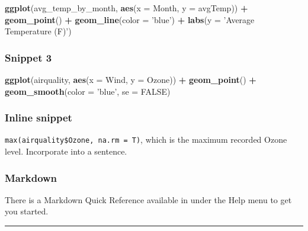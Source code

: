 \documentclass[
]{article}
\newenvironment{Shaded}{\begin{snugshade}}{\end{snugshade}}
\newcommand{\DataTypeTok}[1]{\textcolor[rgb]{0.13,0.29,0.53}{#1}}
\newcommand{\KeywordTok}[1]{\textcolor[rgb]{0.13,0.29,0.53}{\textbf{#1}}}
\newcommand{\NormalTok}[1]{#1}
\newcommand{\OperatorTok}[1]{\textcolor[rgb]{0.81,0.36,0.00}{\textbf{#1}}}
\newcommand{\OtherTok}[1]{\textcolor[rgb]{0.56,0.35,0.01}{#1}}
\newcommand{\StringTok}[1]{\textcolor[rgb]{0.31,0.60,0.02}{#1}}
\begin{document}
\begin{Shaded}
\begin{Highlighting}[]
\KeywordTok{ggplot}\NormalTok{(avg_temp_by_month, }\KeywordTok{aes}\NormalTok{(}\DataTypeTok{x =}\NormalTok{ Month, }\DataTypeTok{y =}\NormalTok{ avgTemp)) }\OperatorTok{+}
\StringTok{  }\KeywordTok{geom_point}\NormalTok{() }\OperatorTok{+}\StringTok{ }
\StringTok{  }\KeywordTok{geom_line}\NormalTok{(}\DataTypeTok{color =} \StringTok{'blue'}\NormalTok{) }\OperatorTok{+}\StringTok{ }
\StringTok{  }\KeywordTok{labs}\NormalTok{(}\DataTypeTok{y =} \StringTok{'Average Temperature (F)'}\NormalTok{)}
\end{Highlighting}
\end{Shaded}

\hypertarget{snippet-3}{%
\subsubsection{Snippet 3}\label{snippet-3}}

\begin{Shaded}
\begin{Highlighting}[]
\KeywordTok{ggplot}\NormalTok{(airquality, }\KeywordTok{aes}\NormalTok{(}\DataTypeTok{x =}\NormalTok{ Wind, }\DataTypeTok{y =}\NormalTok{ Ozone)) }\OperatorTok{+}\StringTok{ }
\StringTok{  }\KeywordTok{geom_point}\NormalTok{() }\OperatorTok{+}\StringTok{ }
\StringTok{  }\KeywordTok{geom_smooth}\NormalTok{(}\DataTypeTok{color =} \StringTok{'blue'}\NormalTok{, }\DataTypeTok{se =} \OtherTok{FALSE}\NormalTok{)}
\end{Highlighting}
\end{Shaded}

\hypertarget{inline-snippet}{%
\subsubsection{Inline snippet}\label{inline-snippet}}

\texttt{max(airquality\$Ozone,\ na.rm\ =\ T)}, which is the maximum
recorded Ozone level. Incorporate into a sentence.

\hypertarget{markdown}{%
\subsubsection{Markdown}\label{markdown}}

There is a Markdown Quick Reference available in under the Help menu to
get you started.

\begin{center}\rule{0.5\linewidth}{0.5pt}\end{center}
\end{document}
